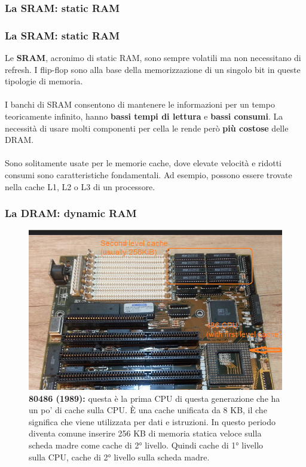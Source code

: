 \subsubsection[La SRAM: static RAM]{La SRAM: static RAM}
\begin{frame}
	\frametitle{La SRAM: static RAM}
	  
	\begin{block}{}
		Le \textbf{SRAM}, acronimo di static RAM, sono sempre volatili ma non necessitano di refresh. I flip-flop sono alla base della memorizzazione di un singolo bit in queste tipologie di memoria.\\~\\
		I banchi di SRAM consentono di mantenere le informazioni per un tempo teoricamente infinito, hanno \textbf{bassi tempi di lettura} e \textbf{bassi consumi}. La necessità di usare molti componenti per cella le rende però \textbf{più costose} delle DRAM.\\~\\
		Sono solitamente usate per le memorie cache, dove elevate velocità e ridotti consumi sono caratteristiche fondamentali. Ad esempio, possono essere trovate nella cache L1, L2 o L3 di un processore.
		
	\end{block}
\end{frame}


\begin{frame}
	\frametitle{La DRAM: dynamic RAM}
	 
	\begin{figure}[!htbp] 
		\centering
		\includegraphics[width=0.62\linewidth]{images/5_memory/cache_1.png}
		\caption{\textbf{80486 (1989):} questa è la prima CPU di questa generazione che ha un po' di cache sulla CPU. È una cache unificata da 8 KB, il che significa che viene utilizzata per dati e istruzioni. In questo periodo diventa comune inserire 256 KB di memoria statica veloce sulla scheda madre come cache di 2° livello. Quindi cache di 1° livello sulla CPU, cache di 2° livello sulla scheda madre.}
	\end{figure}
	
\end{frame}


